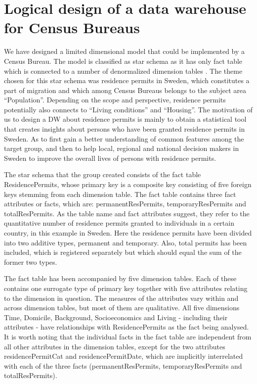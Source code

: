 \section{Logical design of a data warehouse for Census Bureaus}
We have designed a limited dimensional model that could be implemented by a Census Bureau. 
The model is classified as star schema as it has only fact table which is connected to a number 
of denormalized dimension tables \cite[chapter~32.4]{CourseLitt}. The theme chosen for this star schema was 
residence permits in Sweden, which constitutes a part of migration and which among Census Bureaus 
belongs to the subject area “Population”. Depending on the scope and perspective, residence permits 
potentially also connects to “Living conditions” and “Housing”. The motivation of us to design a DW 
about residence permits is mainly to obtain a statistical tool that creates insights about persons 
who have been granted residence permits in Sweden. As to first gain a better understanding of common 
features among the target group, and then to help local, regional and national decision makers in 
Sweden to improve the overall lives of persons with residence permits. 

The star schema that the group created consists of the fact table ResidencePermits, whose primary 
key is a composite key consisting of five foreign keys stemming from each dimension table. The fact 
table contains three fact attributes or facts, which are: permanentResPermits, temporaryResPermits and 
totalResPermits. As the table name and fact attributes suggest, they refer to the quantitative number 
of residence permits granted to individuals in a certain country, in this example in Sweden. Here the 
residence permits have been divided into two additive types, permanent and temporary. Also, total 
permits has been included, which is registered separately but which should equal the sum of the former two types. 

The fact table has been accompanied by five dimension tables. Each of these contains one surrogate 
type of primary key together with five attributes relating to the dimension in question. The measures 
of the attributes vary within and across dimension tables, but most of them are qualitative. All five 
dimensions Time, Domicile, Background, Socioeconomics and Living - including their attributes - have 
relationships with ResidencePermits as the fact being analysed. It is worth noting that the individual 
facts in the fact table are independent from all other attributes in the dimension tables, except for the 
two attributes residencePermitCat and residencePermitDate, which are implicitly interrelated with each of 
the three facts (permanentResPermits, temporaryResPermits and totalResPermits). 
\newpage
